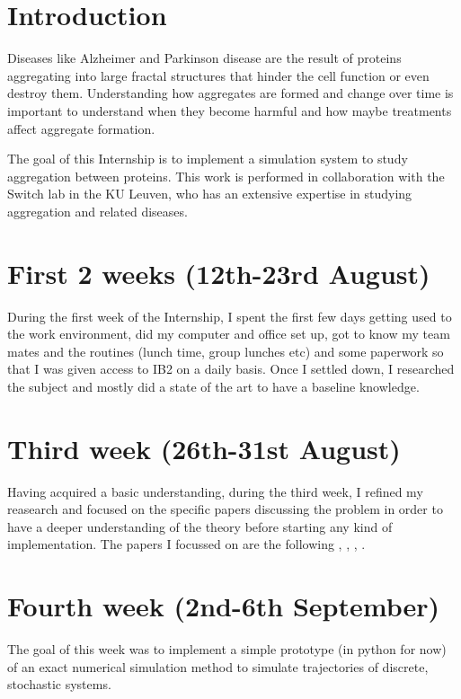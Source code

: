 \documentclass[11pt,a4paper]{article}
\begin{document}


\tableofcontents \pagebreak

\section{Introduction}
Diseases like Alzheimer and Parkinson disease are the result of proteins aggregating into large fractal structures that hinder the cell function or even destroy them. Understanding how aggregates are formed and change over time is important to understand when they become harmful and how maybe treatments affect aggregate formation.

The goal of this Internship is to implement a simulation system to study aggregation between proteins. This work is performed in collaboration with the Switch lab in the KU Leuven, who has an extensive expertise in studying aggregation and related diseases.

\section{First 2 weeks (12th-23rd August)}
During the first week of the Internship, I spent the first few days getting used to the work environment, did my computer and office set up, got to know my team mates and the routines (lunch time, group lunches etc) and some paperwork so that I was given access to IB2 on a daily basis.
Once I settled down, I researched the subject and mostly did a state of the art  to have a baseline knowledge.

\section{Third week (26th-31st August)}
Having acquired a basic understanding, during the third week,  I refined my reasearch and focused on the specific papers discussing the problem in order to have a deeper understanding of the theory before starting any kind of implementation.
The papers I focussed on are the following \cite{gillespie_general_1976}, \cite{meisl_molecular_2016}, \cite{gibson_efficient_2000}, \cite{jonsson_monte_2012}.

\section{Fourth week (2nd-6th September)}
The goal of this week was to implement a simple prototype (in python for now) of an exact numerical simulation method to simulate trajectories of discrete, stochastic systems.
\end{document}
